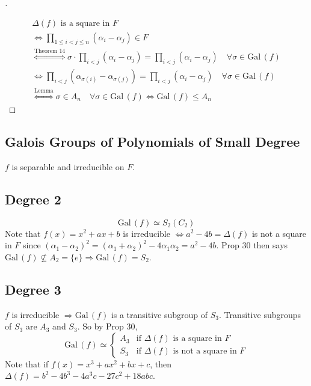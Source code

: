 \documentclass{article}
\theoremstyle{definition}
\newenvironment{proofs}[1][\proofname]{%
  \begin{proof}[#1]$ $\par\nobreak\ignorespaces
}{%
  \end{proof}
}
\newcommand{\Ra}{\Rightarrow}
\newcommand{\Lra}{\Leftrightarrow}
\newcommand{\Gal}{\text{Gal}\,}
\begin{document}
\begin{proofs}
	\begin{gather*}
		\Delta (f) \text{ is a square in } F \\
		\Lra \prod_{1 \leq i < j \leq n} (\alpha_i - \alpha_j) \in F\\ 
		\stackrel{\text{Theorem 14}}{\Lra} \sigma \cdot \prod_{i < j} (\alpha_i - \alpha_j) = \prod_{i < j} (\alpha_i - \alpha_j) \quad \forall \sigma \in \Gal(f)\\
		\Lra  \prod_{i < j} (\alpha_{\sigma(i)} - \alpha_{\sigma(j)}) = \prod_{i < j} (\alpha_i - \alpha_j) \quad \forall \sigma \in \Gal(f)\\
		\stackrel{\text{Lemma}}{\Lra} \sigma \in A_n \quad \forall \sigma \in \Gal(f) \Lra \Gal(f) \leq A_n
	\end{gather*}
\end{proofs}

\subsection*{Galois Groups of Polynomials of Small Degree}

$f$ is separable and irreducible on $F$.

\subsection*{Degree 2}
\[
	\Gal(f) \simeq S_2 (C_2)
\]
Note that $f(x) = x^2 + ax + b$ is irreducible $\Lra a^2 - 4b = \Delta(f)$ is not a square in $F$ since $(\alpha_1 - \alpha_2)^2 = (\alpha_1 + \alpha_2)^2 - 4 \alpha_1 \alpha_2 = a^2 - 4b$.
Prop 30 then says $\Gal(f) \nsubseteq A_2 = \{e\} \Ra \Gal(f) = S_2$.

\subsection*{Degree 3}
$f$ is irreducible $\Ra \Gal(f)$ is a transitive subgroup of $S_3$.
Transitive subgroups of $S_3$ are $A_3$ and $S_3$.
So by Prop 30, 
\[
	\Gal(f) \simeq
	\begin{cases}
		A_3 & \text{if } \Delta(f) \text{ is a square in }F\\
		S_3 & \text{if } \Delta(f) \text{ is not a square in }F
	\end{cases}
\]
Note that if $f(x) = x^3 + ax^2 + bx + c$, then $\Delta(f) = b^2 - 4 b^3 - 4 a^3 c - 27c^2 + 18 abc$.
\end{document}

